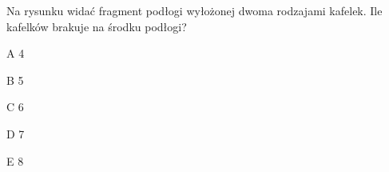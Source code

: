 \begin{tresc}
Na rysunku widać fragment podłogi wyłożonej dwoma rodzajami kafelek. Ile kafelków brakuje na środku podłogi?
\end{tresc}
\begin{wariant}{A} 4 \end{wariant}
\begin{wariant}{B} 5 \end{wariant}
\begin{wariant}{C} 6 \end{wariant}
\begin{wariant}{D} 7 \end{wariant}
\begin{wariant}{E} 8 \end{wariant}
